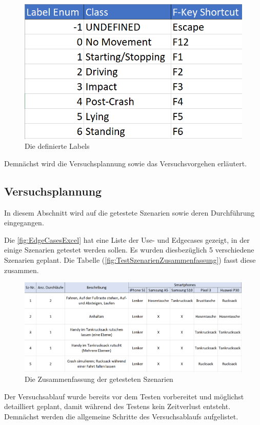 \begin{figure}[H]
	\centering
	\includegraphics[width=0.6\linewidth]{Bilder/TabCalimotoLabelsID.png}
	\caption{Die definierte Labels}
	\label{fig:TabCalimotoLabelsID}
\end{figure}

Demnächst wird die Versuchsplannung sowie das Versuchsvorgehen erläutert.
\subsection{Versuchsplannung}

In diesem Abschnitt wird auf die getestete Szenarien sowie deren Durchführung eingegangen.

Die \autoref{fig:EdgeCasesExcel} hat eine Liste der Use- und Edgecases gezeigt, in der einige Szenarien getestet werden sollen. Es wurden diesbezüglich 5 verschiedene Szenarien geplant.
Die Tabelle (\autoref{fig:TestSzenarienZusammenfassung}) fasst diese zusammen.

\begin{figure}[H]
	\centering
	\includegraphics[width=\linewidth]{Bilder/TestSzenarienZusammenfassung.png}
	\caption{Die Zusammenfassung der getesteten Szenarien}
	\label{fig:TestSzenarienZusammenfassung}
\end{figure}
Der Versuchsablauf wurde bereits vor dem Testen vorbereitet und möglichst detailliert geplant, damit während des Testens kein Zeitverlust entsteht.
Demnächst werden die allgemeine Schritte des Versuchsablaufs aufgelistet.

